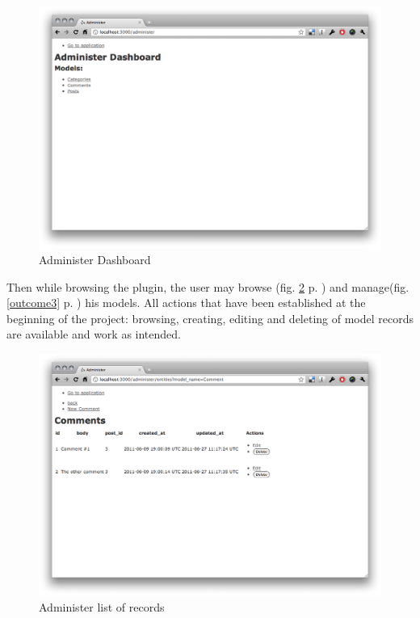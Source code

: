       \begin{figure}[hbt!]
    		\begin{center}
    			\includegraphics[width = 0.8\linewidth]{images/chapter05/outcome1.png}
    			\caption{Administer Dashboard}
    			\label{outcome1}
    		\end{center}
    	\end{figure}
      
      
      Then while browsing the plugin, the user may browse (fig. \ref{outcome2} p. \pageref{outcome2}) 
      and manage(fig. \ref{outcome3} p. \pageref{outcome3}) his
      models. All actions that have been established at the beginning of the project: 
      browsing, creating, editing and deleting of model records are available and work as intended. 
      
      \begin{figure}[hbt!]
    		\begin{center}
    			\includegraphics[width = 0.8\linewidth]{images/chapter05/outcome2.png}
    			\caption{Administer list of records}
    			\label{outcome2}
    		\end{center}
    	\end{figure}
    	
